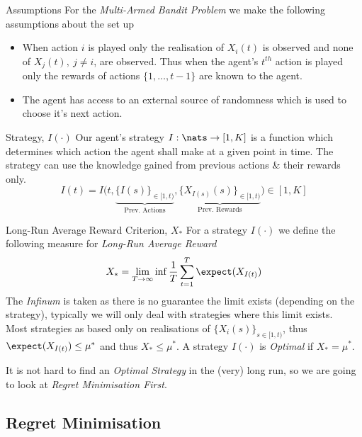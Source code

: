 \documentclass[11pt,a4paper]{article}
\begin{document}
\begin{remark}{Assumptions}
  For the \textit{Multi-Armed Bandit Problem} we make the following assumptions about the set up
  \begin{itemize}
    \item When action $i$ is played only the realisation of $X_i(t)$ is observed and none of $X_j(t),\ j\neq i$, are observed. Thus when the agent's $t^{th}$ action is played only the rewards of actions $\{1,\dots,t-1\}$ are known to the agent.
    \item The agent has access to an external source of randomness which is used to choose it's next action.
  \end{itemize}
\end{remark}

\begin{definition}{Strategy, $I(\cdot)$}
  Our agent's strategy $I:\nats\to[1,K]$ is a function which determines which action the agent shall make at a given point in time. The strategy can use the knowledge gained from previous actions \& their rewards only.
  \[ I(t)=I\big(t,\underbrace{\{I(s)\}_{\in[1,t)}}_\text{Prev. Actions},\underbrace{\{X_{I(s)}(s)\}_{\in[1,t)}}_\text{Prev. Rewards}\big)\in[1,K] \]
\end{definition}

\begin{definition}{Long-Run Average Reward Criterion, $X_*$}
  For a strategy $I(\cdot)$ we define the following measure for \textit{Long-Run Average Reward}
  \[ {\displaystyle X_*=\lim_{T\to\infty}\inf\frac1T\sum_{t=1}^T\expect(X_{I(t)})} \]
  The \textit{Infinum} is taken as there is no guarantee the limit exists (depending on the strategy), typically we will only deal with strategies where this limit exists.\\
  Most strategies as based only on realisations of $\{X_i(s)\}_{s\in[1,t)}$, thus $\expect(X_{I(t)})\leq\mu^*$ and thus $X_*\leq\mu^*$. A strategy $I(\cdot)$ is \textit{Optimal} if $X_*=\mu^*$.
\end{definition}

\begin{remark}{It is not hard to find an \textit{Optimal Strategy} in the (very) long run, so we are going to look at \textit{Regret Minimisation First}.}
\end{remark}

\subsection{Regret Minimisation}
\end{document}
